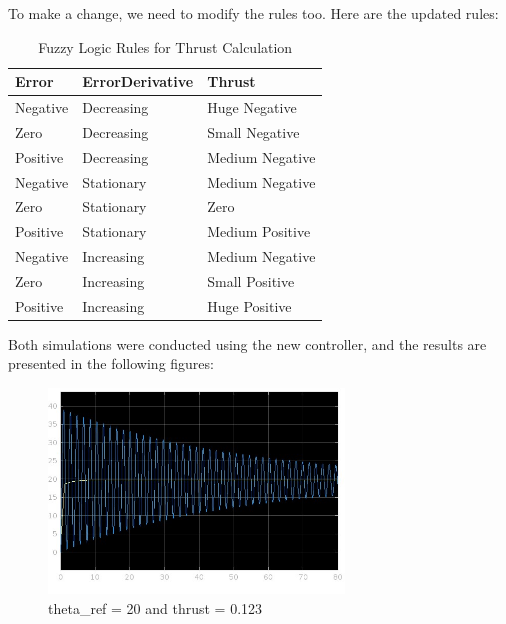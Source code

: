 \documentclass[12pt]{article}
\begin{document}
To make a change, we need to modify the rules too. Here are the updated rules:

\begin{table}[h!]
    \centering
    \renewcommand{\arraystretch}{1.25} %
    \setlength{\tabcolsep}{10pt}      %
    \begin{tabular}{|p{3cm}|p{4cm}|p{5cm}|}
    \hline
    \textbf{\large Error} & \textbf{\large ErrorDerivative} & \textbf{\large Thrust} \\ \hline
    \large Negative       & \large Decreasing               & \large Huge Negative    \\ \hline
    \large Zero           & \large Decreasing               & \large Small Negative   \\ \hline
    \large Positive       & \large Decreasing               & \large Medium Negative  \\ \hline
    \large Negative       & \large Stationary               & \large Medium Negative  \\ \hline
    \large Zero           & \large Stationary               & \large Zero             \\ \hline
    \large Positive       & \large Stationary               & \large Medium Positive  \\ \hline
    \large Negative       & \large Increasing               & \large Medium Negative  \\ \hline
    \large Zero           & \large Increasing               & \large Small Positive   \\ \hline
    \large Positive       & \large Increasing               & \large Huge Positive    \\ \hline
    \end{tabular}
    \caption{Fuzzy Logic Rules for Thrust Calculation}
    \label{tab:rules}
\end{table}

Both simulations were conducted using the new controller, and the results are presented in the following figures:

\begin{figure}[h!]
    \centering
    \includegraphics[width=0.7\textwidth]{complex1.jpg}
    \caption{theta\_ref = 20 and thrust = 0.123}
    \label{fig:complex1}
\end{figure}
\end{document}
